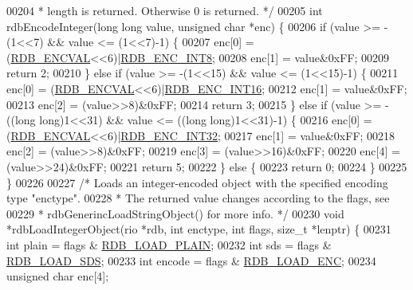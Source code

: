 \begin{DoxyCode}
{{{{00204 \textcolor{comment}{ * length is returned. Otherwise 0 is returned. */}
00205 \textcolor{keywordtype}{int} rdbEncodeInteger(\textcolor{keywordtype}{long} \textcolor{keywordtype}{long} value, \textcolor{keywordtype}{unsigned} \textcolor{keywordtype}{char} *enc) \{
00206     \textcolor{keywordflow}{if} (value >= -(1<<7) && value <= (1<<7)-1) \{
00207         enc[0] = (\hyperlink{rdb_8h_a060ed4ae9ab0a1306508189d4c1b2e11}{RDB\_ENCVAL}<<6)|\hyperlink{rdb_8h_a56f2f16c5470043c643add1010823d23}{RDB\_ENC\_INT8};
00208         enc[1] = value&0xFF;
00209         \textcolor{keywordflow}{return} 2;
00210     \} \textcolor{keywordflow}{else} \textcolor{keywordflow}{if} (value >= -(1<<15) && value <= (1<<15)-1) \{
00211         enc[0] = (\hyperlink{rdb_8h_a060ed4ae9ab0a1306508189d4c1b2e11}{RDB\_ENCVAL}<<6)|\hyperlink{rdb_8h_a79072da2d9fb562368f1798bdf8d7645}{RDB\_ENC\_INT16};
00212         enc[1] = value&0xFF;
00213         enc[2] = (value>>8)&0xFF;
00214         \textcolor{keywordflow}{return} 3;
00215     \} \textcolor{keywordflow}{else} \textcolor{keywordflow}{if} (value >= -((\textcolor{keywordtype}{long} \textcolor{keywordtype}{long})1<<31) && value <= ((\textcolor{keywordtype}{long} \textcolor{keywordtype}{long})1<<31)-1) \{
00216         enc[0] = (\hyperlink{rdb_8h_a060ed4ae9ab0a1306508189d4c1b2e11}{RDB\_ENCVAL}<<6)|\hyperlink{rdb_8h_ab74cba44dacad1f1f0d87dffba9efa98}{RDB\_ENC\_INT32};
00217         enc[1] = value&0xFF;
00218         enc[2] = (value>>8)&0xFF;
00219         enc[3] = (value>>16)&0xFF;
00220         enc[4] = (value>>24)&0xFF;
00221         \textcolor{keywordflow}{return} 5;
00222     \} \textcolor{keywordflow}{else} \{
00223         \textcolor{keywordflow}{return} 0;
00224     \}
00225 \}
00226 
00227 \textcolor{comment}{/* Loads an integer-encoded object with the specified encoding type "enctype".}
00228 \textcolor{comment}{ * The returned value changes according to the flags, see}
00229 \textcolor{comment}{ * rdbGenerincLoadStringObject() for more info. */}
00230 \textcolor{keywordtype}{void} *rdbLoadIntegerObject(rio *rdb, \textcolor{keywordtype}{int} enctype, \textcolor{keywordtype}{int} flags, size\_t *lenptr) \{
00231     \textcolor{keywordtype}{int} plain = flags & \hyperlink{rdb_8h_a5579c0ff24afa891ad41006def040a25}{RDB\_LOAD\_PLAIN};
00232     \textcolor{keywordtype}{int} sds = flags & \hyperlink{rdb_8h_ad15f5cc8e1a7789cc35b66f017e98a18}{RDB\_LOAD\_SDS};
00233     \textcolor{keywordtype}{int} encode = flags & \hyperlink{rdb_8h_aea74502dc3a9f291a2ac8f3bd7d6de24}{RDB\_LOAD\_ENC};
00234     \textcolor{keywordtype}{unsigned} \textcolor{keywordtype}{char} enc[4];
}}}}
\end{DoxyCode}

